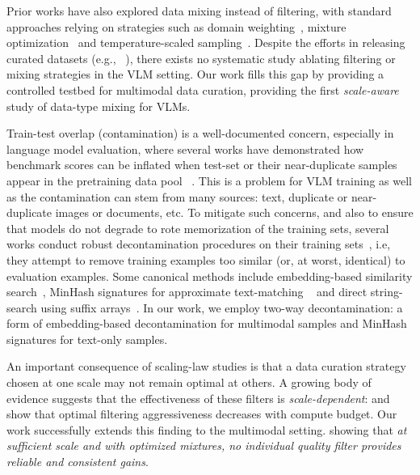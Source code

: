 Prior works have also explored data mixing instead of filtering, with standard approaches relying on strategies such as domain weighting~\citep{xie2023doremi,olmo20242}, mixture optimization~\citep{chen2026olmix,berasi2026linear,diao2025nemotron,kang2024autoscale,ye2024data,liu2024regmix} and temperature-scaled sampling~\citep{deitke2025molmo,clark2026molmo2}. %
Despite the efforts in releasing curated datasets (e.g., \fv~\citep{wiedmann2025finevision}), there exists no systematic study ablating filtering or mixing strategies in the VLM setting.  Our work fills this gap by providing a controlled testbed for multimodal data curation, providing the first \emph{scale-aware} study of data-type mixing for VLMs. 





Train-test overlap (contamination) is a well-documented concern, especially in language model evaluation, where several works have demonstrated how benchmark scores can be inflated when test-set or their near-duplicate samples appear in the pretraining data pool ~\citep{jiang2024investigating,magar2022data,sainz2024data,bordt2024much,schaeffer2026quantifying}.
This is a problem for VLM training as well as the contamination can stem from many sources: text, duplicate or near-duplicate images or documents, etc. To mitigate such concerns, and also to ensure that models do not degrade to rote memorization of the training sets, several works conduct robust decontamination procedures on their training sets~\citep{beyer2024paligemma,zhai2022scaling,oquab2023dinov2,trinh2018simple,gao2020pile,mizrahi2025language,allal2025smollm2}, i.e, they attempt to remove training examples too similar (or, at worst, identical) to evaluation examples. 
Some canonical methods include embedding-based similarity search~\citep{oquab2023dinov2,wiedmann2025finevision}, MinHash signatures for approximate text-matching ~\citep{penedo2024fineweb,li2024datacomp,broder1997resemblance} and direct string-search using suffix arrays~\citep{lee2022deduplicating}. 
In our work, we employ two-way decontamination: a form of embedding-based decontamination for multimodal samples and MinHash signatures for text-only samples. 

An important consequence of scaling-law studies is that a data curation strategy chosen at one scale may not remain optimal at others. A growing body of evidence suggests that the effectiveness of these filters is \emph{scale-dependent}: \citet{goyal2024scaling} and \citet{mizrahi2025language} show that optimal filtering aggressiveness decreases with compute budget. Our work successfully extends this finding to the multimodal setting.
showing that \emph{at sufficient scale and with optimized mixtures, no individual quality filter provides reliable and consistent gains}.

